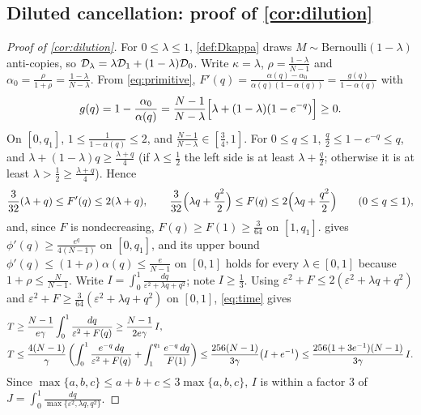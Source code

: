 \subsection{Diluted cancellation: proof of \texorpdfstring{\cref{cor:dilution}}{the dilution corollary}}
\label{app:dilution}
\begin{proof}[Proof of \cref{cor:dilution}]
For $0\le\lambda\le1$, \cref{def:Dkappa} draws $M\sim\mathrm{Bernoulli}(1-\lambda)$ anti-copies, so $\mathcal D_{\lambda}=\lambda\mathcal D_{1}+(1-\lambda)\mathcal D_{0}$.
Write $\kappa=\lambda$, $\rho=\tfrac{1-\lambda}{N-1}$ and $\alpha_0=\tfrac{\rho}{1+\rho}=\tfrac{1-\lambda}{N-\lambda}$.
From \cref{eq:primitive}, $F'(q)=\tfrac{\alpha(q)-\alpha_0}{\alpha(q)(1-\alpha(q))}=\tfrac{g(q)}{1-\alpha(q)}$ with
\[
 g(q)=1-\frac{\alpha_0}{\alpha(q)}=\frac{N-1}{N-\lambda}\Bigl[\lambda+(1-\lambda)(1-e^{-q})\Bigr]\ge0 .
\]
On $[0,q_1]$, $1\le\tfrac{1}{1-\alpha(q)}\le2$, and $\tfrac{N-1}{N-\lambda}\in[\tfrac{3}{4},1]$. For $0\le q\le1$, $\tfrac{q}{2}\le1-e^{-q}\le q$, and
$\lambda+(1-\lambda)q\ge\tfrac{\lambda+q}{4}$ (if $\lambda\le\tfrac12$ the left side is at least $\lambda+\tfrac{q}{2}$; otherwise it is at least $\lambda>\tfrac12\ge\tfrac{\lambda+q}{4}$). Hence
\[
 \frac{3}{32}(\lambda+q)\le F'(q)\le2(\lambda+q),\qquad
 \frac{3}{32}\Bigl(\lambda q+\frac{q^2}{2}\Bigr)\le F(q)\le2\Bigl(\lambda q+\frac{q^2}{2}\Bigr)\qquad(0\le q\le1),
\]
and, since $F$ is nondecreasing, $F(q)\ge F(1)\ge\tfrac{3}{64}$ on $[1,q_1]$.
 gives $\phi'(q)\ge\tfrac{e^q}{4(N-1)}$ on $[0,q_1]$, and its upper bound $\phi'(q)\le(1+\rho)\alpha(q)\le\tfrac{e}{N-1}$ on $[0,1]$ holds for every $\lambda\in[0,1]$ because $1+\rho\le\tfrac{N}{N-1}$.
Write $I=\int_0^1\tfrac{dq}{\varepsilon^2+\lambda q+q^2}$; note $I\ge\tfrac{1}{3}$. Using $\varepsilon^2+F\le2(\varepsilon^2+\lambda q+q^2)$ and $\varepsilon^2+F\ge\tfrac{3}{64}(\varepsilon^2+\lambda q+q^2)$ on $[0,1]$, \cref{eq:time} gives
\begin{align*}
 T&\ge\frac{N-1}{e\gamma}\int_0^1\frac{dq}{\varepsilon^2+F(q)}\ge\frac{N-1}{2e\gamma}\,I,\\
 T&\le\frac{4(N-1)}{\gamma}\left(\int_0^1\frac{e^{-q}\,dq}{\varepsilon^2+F(q)}+\int_1^{q_1}\frac{e^{-q}\,dq}{F(1)}\right)
 \le\frac{256(N-1)}{3\gamma}\bigl(I+e^{-1}\bigr)\le\frac{256(1+3e^{-1})(N-1)}{3\gamma}\,I .
\end{align*}
Since $\max\{a,b,c\}\le a+b+c\le3\max\{a,b,c\}$, $I$ is within a factor $3$ of $J=\int_0^1\tfrac{dq}{\max\{\varepsilon^2,\lambda q,q^2\}}$.

\end{proof}
